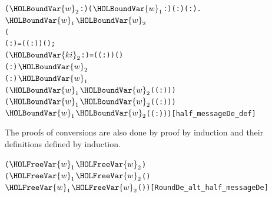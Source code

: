 \documentclass{article}
\begin{document}
\begin{alltt}
\HOLTokenTurnstile{} \HOLSymConst{\HOLTokenForall{}}(\ensuremath{\HOLBoundVar{w}\sb{\mathrm{2}}} :) (\ensuremath{\HOLBoundVar{w}\sb{\mathrm{1}}} :) ( :) ( : ).
      \ensuremath{\HOLBoundVar{w}\sb{\mathrm{1}}} \ensuremath{\HOLBoundVar{w}\sb{\mathrm{2}}}   \HOLSymConst{=}
     (
        ( :) =  ( \HOLSymConst{\ensuremath{-}} ( :)) ( );
        (\ensuremath{\HOLBoundVar{ki}\sb{\mathrm{2}}} :) =  ( \HOLSymConst{\ensuremath{-}} ( :)) ( )
          \HOLSymConst{=} ( :)  \ensuremath{\HOLBoundVar{w}\sb{\mathrm{2}}}
           \HOLSymConst{=} ( :)  \ensuremath{\HOLBoundVar{w}\sb{\mathrm{1}}}
          ( \ensuremath{\HOLBoundVar{w}\sb{\mathrm{1}}} \ensuremath{\HOLBoundVar{w}\sb{\mathrm{2}}}  ( \HOLSymConst{\ensuremath{-}} ( :)) \HOLSymConst{\ensuremath{-}} ) \HOLSymConst{\HOLTokenRor{}}
           ( \ensuremath{\HOLBoundVar{w}\sb{\mathrm{1}}} \ensuremath{\HOLBoundVar{w}\sb{\mathrm{2}}}  ( \HOLSymConst{\ensuremath{-}} ( :))) \HOLSymConst{\HOLTokenEor{}}
           \ensuremath{\HOLBoundVar{w}\sb{\mathrm{1}}} \ensuremath{\HOLBoundVar{w}\sb{\mathrm{2}}}  ( \HOLSymConst{\ensuremath{-}} ( :)))\hfill{[half_messageDe_def]}
\end{alltt}

The proofs of conversions are also done by proof by induction and their definitions defined by induction.

\begin{alltt}
\HOLTokenTurnstile{}    (\ensuremath{\HOLFreeVar{w}\sb{\mathrm{1}}}\HOLSymConst{,}\ensuremath{\HOLFreeVar{w}\sb{\mathrm{2}}}) \HOLSymConst{=}
   ( \ensuremath{\HOLFreeVar{w}\sb{\mathrm{1}}} \ensuremath{\HOLFreeVar{w}\sb{\mathrm{2}}}  ( \HOLSymConst{\HOLTokenProd{}}  \HOLSymConst{\ensuremath{+}} )\HOLSymConst{,}
     \ensuremath{\HOLFreeVar{w}\sb{\mathrm{1}}} \ensuremath{\HOLFreeVar{w}\sb{\mathrm{2}}}  ( \HOLSymConst{\HOLTokenProd{}} ))\hfill{[RoundDe_alt_half_messageDe]}
\end{alltt}
\end{document}
